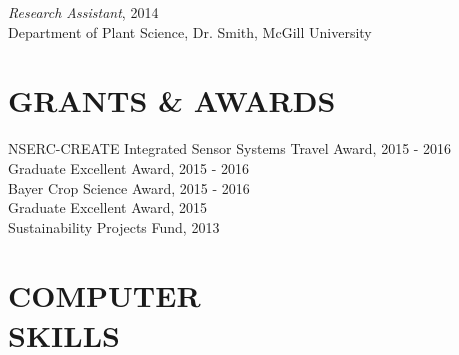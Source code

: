 \documentclass[margin, 10pt]{res} %
\begin{document}
\begin{resume}
{\sl  Research Assistant}, 2014 \\
Department of Plant Science, Dr. Smith, McGill University



\section{GRANTS \& AWARDS}

NSERC-CREATE Integrated Sensor Systems Travel Award, 2015 - 2016\\
Graduate Excellent Award, 2015 - 2016 \\
Bayer Crop Science Award, 2015 - 2016\\
Graduate Excellent Award, 2015 \\
Sustainability Projects Fund, 2013



%
%
%  

\section{COMPUTER \\ SKILLS} 


\end{resume}
\end{document}
